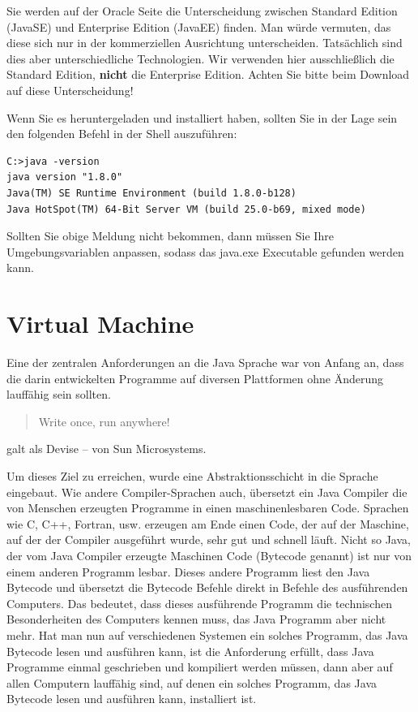 Sie werden auf der Oracle Seite die Unterscheidung zwischen Standard Edition (JavaSE) und Enterprise Edition (JavaEE) finden. Man würde vermuten, das diese sich nur in der kommerziellen Ausrichtung unterscheiden. Tatsächlich sind dies aber unterschiedliche Technologien. Wir verwenden hier ausschließlich die Standard Edition, \textbf{nicht} die Enterprise Edition. Achten Sie bitte beim Download auf diese Unterscheidung!

Wenn Sie es heruntergeladen und installiert haben, sollten Sie in der Lage sein den folgenden Befehl in der Shell auszuführen:
\begin{Verbatim}[fontsize=\small]
C:>java -version
java version "1.8.0"
Java(TM) SE Runtime Environment (build 1.8.0-b128)
Java HotSpot(TM) 64-Bit Server VM (build 25.0-b69, mixed mode)
\end{Verbatim}

Sollten Sie obige Meldung nicht bekommen, dann müssen Sie Ihre Umgebungsvariablen anpassen, sodass das java.exe Executable gefunden werden kann.

\section{Virtual Machine}

Eine der zentralen Anforderungen an die Java Sprache war von Anfang an, dass die darin entwickelten Programme auf diversen Plattformen ohne Änderung lauffähig sein sollten. 
\begin{quote}
Write once, run anywhere!
\end{quote}
galt als Devise -- von Sun Microsystems. 

Um dieses Ziel zu erreichen, wurde eine Abstraktionsschicht in die Sprache eingebaut. Wie andere Compiler-Sprachen auch, übersetzt ein Java Compiler die von Menschen erzeugten Programme in einen maschinenlesbaren Code. Sprachen wie C, C++, Fortran, usw. erzeugen am Ende einen Code, der auf der Maschine, auf der der Compiler ausgeführt wurde, sehr gut und schnell läuft. Nicht so Java, der vom Java Compiler erzeugte Maschinen Code (Bytecode genannt) ist nur von einem anderen Programm lesbar. Dieses andere Programm liest den Java Bytecode und übersetzt die Bytecode Befehle direkt in Befehle des ausführenden Computers. Das bedeutet, dass dieses ausführende Programm die technischen Besonderheiten des Computers kennen muss, das Java Programm aber nicht mehr. Hat man nun auf verschiedenen Systemen ein solches Programm, das Java Bytecode lesen und ausführen kann, ist die Anforderung erfüllt, dass Java Programme einmal geschrieben und kompiliert werden müssen, dann aber auf allen Computern lauffähig sind, auf denen ein solches Programm, das Java Bytecode lesen und ausführen kann, installiert ist. 

